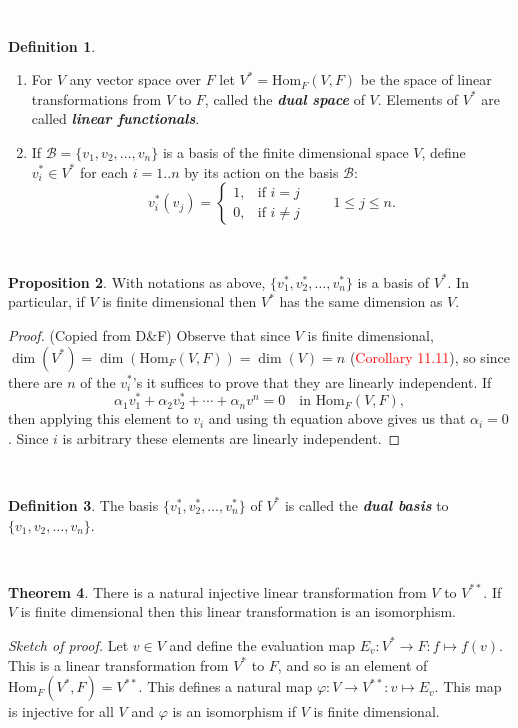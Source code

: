 \documentclass{article}
\theoremstyle{definition}
\newtheorem{thm}{Theorem}[section]
\newtheorem{prop}[thm]{Proposition}
\newtheorem{defn}[thm]{Definition}
\newcommand{\nl}{\textcolor{white}{nothing}}
\newcommand{\ra}{\rightarrow}
\newcommand{\al}{\alpha}
\newcommand{\vphi}{\varphi}
\newcommand{\Hom}{\text{Hom}}
\newcommand{\BB}{\mathcal{B}}
\begin{document}
\nl

\begin{defn}\nl
\begin{enumerate}
\item For $V$ any vector space over $F$ let $V^* = \Hom_F(V,F)$ be the space of linear transformations from $V$ to $F$, called the \textit{\textbf{dual space}} of $V$. Elements of $V^*$ are called \textit{\textbf{linear functionals}}.
\item If $\BB  = \{v_1,v_2,\ldots,v_n\}$ is a basis of the finite dimensional space $V$, define $v_i^* \in V^*$ for each $i = 1..n$ by its action on the basis $\BB$:
\[v_i^*(v_j) = \begin{cases}1, & \text{if } i = j\\
0, & \text{if } i \neq j\end{cases}\qquad 1\leq j\leq n.\]
\end{enumerate}
\end{defn}

\nl

\begin{prop}
With notations as above, $\{v_1^*,v_2^*,\ldots,v_n^*\}$ is a basis of $V^*$. In particular, if $V$ is finite dimensional then $V^*$ has the same dimension as $V$.

\begin{proof}
(Copied from D\&F) Observe that since $V$ is finite dimensional, $\dim(V^*) = \dim(\Hom_F(V,F)) = \dim(V) = n$ (\textcolor{red}{Corollary 11.11}), so since there are $n$ of the $v_i^*$'s it suffices to prove that they are linearly independent. If
\[\al_1v_1^* + \al_2v_2^* + \cdots + \al_nv^n = 0\quad \text{in } \Hom_F(V,F),\]
then applying this element to $v_i$ and using th equation above gives us that $\al_i = 0$. Since $i$ is arbitrary these elements are linearly independent.
\end{proof}
\end{prop}

\nl

\begin{defn}
The basis $\{v_1^*,v_2^*,\ldots,v_n^*\}$ of $V^*$ is called the \textit{\textbf{dual basis}} to  $\{v_1,v_2,\ldots,v_n\}$.
\end{defn}

\nl

\begin{thm}
There is a natural injective linear transformation from $V$ to $V^{**}$. If $V$ is finite dimensional then this linear transformation is an isomorphism. 

\textit{Sketch of proof.} Let $v\in V$ and define the evaluation map $E_v:V^*\ra F:f\mapsto f(v)$. This is a linear transformation from $V^*$ to $F$, and so is an element of $\Hom_F(V^*, F) = V^{**}$. This defines a natural map $\vphi: V\ra V^{**}:v\mapsto E_v$. This map is injective for all $V$ and $\vphi$ is an isomorphism if $V$ is finite dimensional.
\end{thm}
\end{document}
